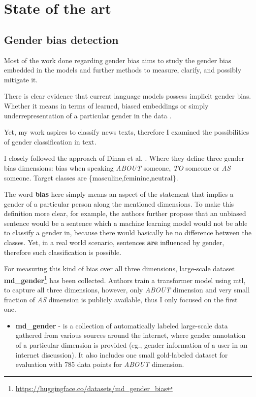 \chapter{State of the art}

\section{Gender bias detection}\label{gender}
Most of the work done regarding gender bias aims to study the gender bias embedded in the models and further methods to measure, clarify, and possibly mitigate it.

There is clear evidence that current language models possess implicit gender bias. Whether it means in terms of learned, biased embeddings \cite{bolukbasi2016man} or simply underrepresentation of a particular gender in the data \cite{sun-peng-2021-men}. 

Yet, my work aspires to classify news texts, therefore I examined the possibilities of gender classification in text.

I closely followed the approach of Dinan et al. \cite{dinan2020multi}. Where they define three gender bias dimensions: bias when speaking \textit{ABOUT} someone, \textit{TO} someone or \textit{AS} someone. Target classes are \{masculine,feminine,neutral\}. 

The word \textbf{bias} here simply means an aspect of the statement that implies a gender of a particular person along the mentioned dimensions. To make this definition more clear, for example, the authors further propose that an unbiased sentence would be a sentence which a machine learning model would not be able to classify a gender in, because there would basically be no difference between the classes. Yet, in a real world scenario, sentences \textbf{are} influenced by gender, therefore such classification is possible.

For measuring this kind of bias over all three dimensions, large-scale dataset \textbf{md\_gender}\footnote{\url{https://huggingface.co/datasets/md_gender_bias}} has been collected. Authors train a transformer model using \Gls{mtl}, to capture all three dimensions, however, only \textit{ABOUT} dimension and very small fraction of \textit{AS} dimension is publicly available, thus I only focused on the first one.

\begin{itemize}
\item \textbf{md\_gender} - is a collection of automatically labeled large-scale data gathered from various sources around the internet, where gender annotation of a particular dimension is provided (eg., gender information of a user in an internet discussion). It also includes one small gold-labeled dataset for evaluation with 785 data points for \textit{ABOUT} dimension.
\end{itemize}

